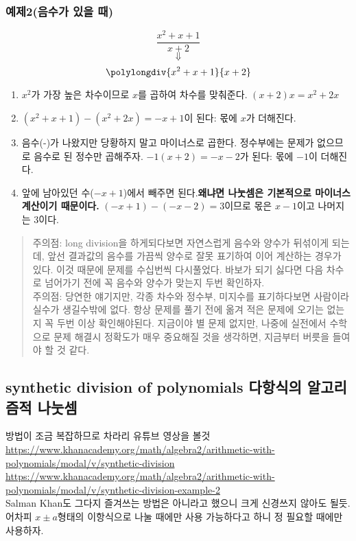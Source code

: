 \documentclass{article}
\begin{document}
\subsubsection{예제2(음수가 있을 때)}
$$\frac{x^{2}+x+1}{x+2}$$
$$\Downarrow$$
$$\polylongdiv{x^{2}+x+1}{x+2}$$
\begin{enumerate}
\item $x^{2}$가 가장 높은 차수이므로 $x$를 곱하여 차수를 맞춰준다. $(x+2)x=x^{2}+2x$
\item $(x^{2}+x+1)-(x^{2}+2x)=-x+1$이 된다: 몫에 $x$가 더해진다.
\item 음수(-)가 나왔지만 당황하지 말고 마이너스로 곱한다. 정수부에는 문제가 없으므로 음수로 된 정수만 곱해주자. $-1(x+2)=-x-2$가 된다: 몫에 $-1$이 더해진다.
\item 앞에 남아있던 수($-x+1$)에서 빼주면 된다.\textbf{왜냐면 나눗셈은 기본적으로 마이너스 계산이기 때문이다.} $(-x+1)-(-x-2)=3$이므로 몫은 $x-1$이고 나머지는 $3$이다.
\end{enumerate}
\begin{quote}
{\color{red} 주의점}: long division을 하게되다보면 자연스럽게 음수와 양수가 뒤섞이게 되는데, 앞선 결과값의 음수를 가끔씩 양수로 잘못 표기하여 이어 계산하는 경우가 있다. 이것 때문에 문제를 수십번씩 다시풀었다. 바보가 되기 싫다면 다음 차수로 넘어가기 전에 꼭 음수와 양수가 맞는지 두번 확인하자.\\
{\color{red} 주의점}: 당연한 얘기지만, 각종 차수와 정수부, 미지수를 표기하다보면 사람이라 실수가 생길수밖에 없다. 항상 문제를 풀기 전에 옮겨 적은 문제에 오기는 없는지 꼭 두번 이상 확인해야된다. 지금이야 별 문제 없지만, 나중에 실전에서 수학으로 문제 해결시 정확도가 매우 중요해질 것을 생각하면, 지금부터 버릇을 들여야 할 것 같다.
\end{quote}

\subsection {synthetic division of polynomials 다항식의 알고리즘적 나눗셈}
방법이 조금 복잡하므로 차라리 유튜브 영상을 볼것
\vspace{12pt}\\
\url{https://www.khanacademy.org/math/algebra2/arithmetic-with-polynomials/modal/v/synthetic-division}
\vspace{12pt}\\
\url{https://www.khanacademy.org/math/algebra2/arithmetic-with-polynomials/modal/v/synthetic-division-example-2}\\
Salman Khan도 그다지 즐겨쓰는 방법은 아니라고 했으니 크게 신경쓰지 않아도 될듯. 어차피 $x\pm a$형태의 이항식으로 나눌 때에만 사용 가능하다고 하니 정 필요할 때에만 사용하자.
\end{document}
